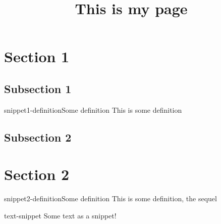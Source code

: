 \documentclass[preview]{standalone}
\begin{document}
\title{This is my page}

\genpage
\gencourse

\section{Section 1}

\subsection{Subsection 1}

\begin{snippetdefinition}{snippet1-definition}{Some definition}
    This is some definition
\end{snippetdefinition}

\subsection{Subsection 2}

\section{Section 2}

\begin{snippetdefinition}{snippet2-definition}{Some definition}
    This is some definition, the sequel
\end{snippetdefinition}


\begin{snippet}{text-snippet}
    Some text as a snippet!
\end{snippet}
\end{document}
